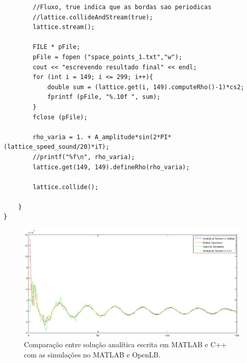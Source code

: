 \begin{lstlisting}
        //Fluxo, true indica que as bordas sao periodicas
        //lattice.collideAndStream(true);
        lattice.stream();

        FILE * pFile;
        pFile = fopen ("space_points_1.txt","w");
        cout << "escrevendo resultado final" << endl;
        for (int i = 149; i <= 299; i++){
            double sum = (lattice.get(i, 149).computeRho()-1)*cs2;
            fprintf (pFile, "%.10f ", sum);
        }
        fclose (pFile);

        rho_varia = 1. + A_amplitude*sin(2*PI*(lattice_speed_sound/20)*iT);
        //printf("%f\n", rho_varia);
        lattice.get(149, 149).defineRho(rho_varia);

        lattice.collide();

    }
}
 \end{lstlisting}

\begin{figure}[h!]
    \centering
    \hspace{-2.5cm}
    \includegraphics[width=1.2\textwidth]{figuras/openlb.eps}
    \caption{Comparação entre solução analítica escrita em MATLAB e C++ com as simulações no MATLAB e OpenLB.}
\end{figure}




